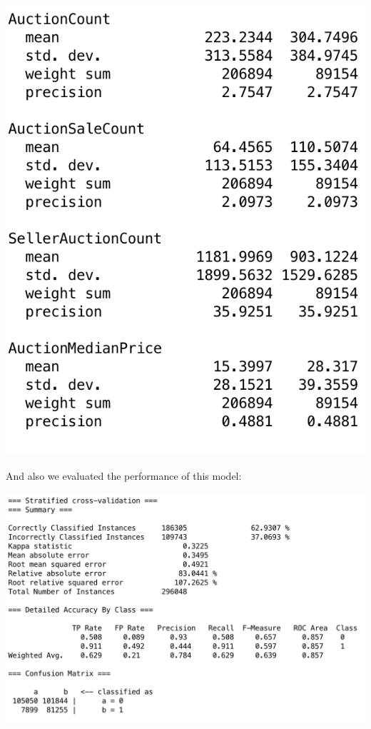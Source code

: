 \documentclass[CEJM,PDF]{cej} %
\begin{document}
\begin{center}
\includegraphics[scale=0.5]{weka-nb-model2.png}
\end{center}
And also we evaluated the performance of this model:
\begin{center}
\includegraphics[scale=0.5]{weka-nb-result.png}
\end{center}
\end{document}

